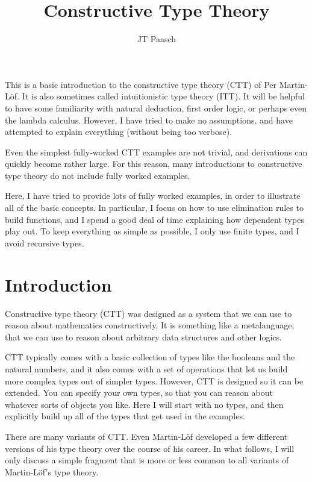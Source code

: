 \documentclass{article}
\begin{document}
\title{Constructive Type Theory}
\author{JT Paasch}
\date{}

\maketitle

This is a basic introduction to the constructive type theory (CTT) of Per Martin-L\"of. It is also sometimes called intuitionistic type theory (ITT). It will be helpful to have some familiarity with natural deduction, first order logic, or perhaps even the lambda calculus. However, I have tried to make no assumptions, and have attempted to explain everything (without being too verbose). 

Even the simplest fully-worked CTT examples are not trivial, and derivations can quickly become rather large. For this reason, many introductions to constructive type theory do not include fully worked examples.

Here, I have tried to provide lots of fully worked examples, in order to illustrate all of the basic concepts. In particular, I focus on how to use elimination rules to build functions, and I spend a good deal of time explaining how dependent types play out. To keep everything as simple as possible, I only use finite types, and I avoid recursive types.


\section{Introduction}

Constructive type theory (CTT) was designed as a system that we can use to reason about mathematics constructively. It is something like a metalanguage, that we can use to reason about arbitrary data structures and other logics.

CTT typically comes with a basic collection of types like the booleans and the natural numbers, and it also comes with a set of operations that let us build more complex types out of simpler types. However, CTT is designed so it can be extended. You can specify your own types, so that you can reason about whatever sorts of objects you like. Here I will start with no types, and then explicitly build up all of the types that get used in the examples.

There are many variants of CTT. Even Martin-L\"of developed a few different versions of his type theory over the course of his career. In what follows, I will only discuss a simple fragment that is more or less common to all variants of Martin-L\"of's type theory.
\end{document}
